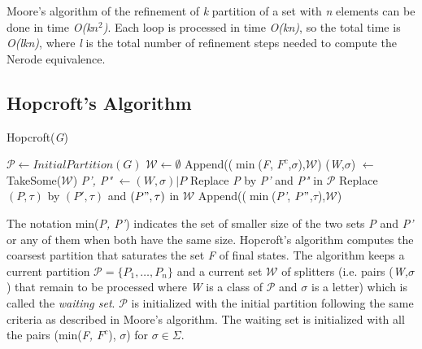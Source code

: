 {Moore's algorithm of the refinement of \textit{k} partition of a set with \textit{n} elements can be done in time \textit{O(k$n^2$)}. Each loop is processed in time \textit{O(kn)}, so the total time is \textit{O(lkn)}, where \textit{l} is the total number of refinement steps needed to compute the Nerode equivalence.

\subsection{Hopcroft's Algorithm}

\begin{algorithm} 
  \caption{Hopcroft(\textit{G})\label{alg:hop}}
    \begin{algorithmic}[1]
      \State $\mathcal{P} \leftarrow InitialPartition(G)$
      \State $\mathcal{W} \leftarrow \emptyset$
      \ForAll{$\sigma \in \Sigma$}
      	\State Append(($\min$(\textit{F}, $F^c$,$\sigma$),$\mathcal{W}$)
      		\State (\textit{W},$\sigma$) $\leftarrow$ TakeSome($\mathcal{W}$)
				\State \textit{P', P"} $\leftarrow (W,\sigma)|P$      		
				Replace \textit{P} by \textit{P'} and \textit{P"} in $\mathcal{P}$
				\ForAll{$\tau \in \Sigma$}
						\State Replace $(P,\tau)$ by $(P',\tau)$ and $(P",\tau)$ in $\mathcal{W}$
					\Else
						\State Append(($\min$(\textit{P'}, $P"$,$\tau$),$\mathcal{W}$)				
					\EndIf				
				\EndFor 
      		\EndFor
      	\EndWhile
      \EndFor
    \end{algorithmic}
  \end{algorithm}

The notation min(\textit{P, P'}) indicates the set of smaller size of the two sets \textit{P} and \textit{P'} or any of them when both have the same size. Hopcroft's algorithm computes the coarsest partition that saturates the set \textit{F} of final states. The algorithm keeps a current partition $\mathcal{P} = \{P_1, \ldots, P_n\}$ and a current set $\mathcal{W}$ of splitters (i.e. pairs (\textit{W,$\sigma$}) that remain to be processed where \textit{W} is a class of $\mathcal{P}$ and $\sigma$ is a letter) which is called the \textit{waiting set}. $\mathcal{P}$ is initialized with the initial partition following the same criteria as described in Moore's algorithm. The waiting set is initialized with all the pairs (min(\textit{F, $F^c$}), $\sigma$) for $\sigma\in\Sigma$.

}

